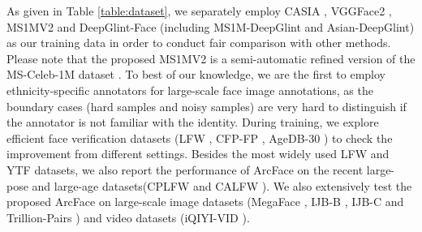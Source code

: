 \documentclass[10pt,twocolumn,letterpaper]{article}
\begin{document}
 As given in Table \ref{table:dataset}, we separately employ CASIA \cite{yi2014learning}, VGGFace2 \cite{cao2017vggface2}, MS1MV2 and DeepGlint-Face (including MS1M-DeepGlint and Asian-DeepGlint) \cite{glintweb} as our training data in order to conduct fair comparison with other methods. Please note that the proposed MS1MV2 is a semi-automatic refined version of the MS-Celeb-1M dataset \cite{guo2016ms}. To best of our knowledge, we are the first to employ ethnicity-specific annotators for large-scale face image annotations, as the boundary cases (\eg hard samples and noisy samples) are very hard to distinguish if the annotator is not familiar with the identity. During training, we explore efficient face verification datasets (\eg LFW \cite{huang2007labeled}, CFP-FP \cite{sengupta2016frontal}, AgeDB-30 \cite{Moschoglou2017AgeDB}) to check the improvement from different settings. Besides the most widely used LFW \cite{huang2007labeled} and YTF \cite{wolf2011face} datasets, we also report the performance of ArcFace on the recent large-pose and large-age datasets(\eg CPLFW \cite{zheng2018cross} and CALFW \cite{zheng2017cross}). We also extensively test the proposed ArcFace on large-scale image datasets (\eg MegaFace \cite{kemelmacher2016megaface}, IJB-B \cite{whitelam2017iarpa}, IJB-C \cite{maze2018iarpa} and Trillion-Pairs \cite{glintweb}) and video datasets (iQIYI-VID \cite{IQIYI2018}).
\end{document}
